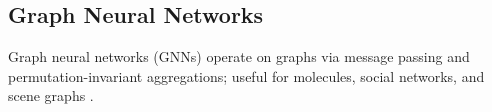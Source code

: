 \subsection{Graph Neural Networks}

Graph neural networks (GNNs) operate on graphs via message passing and permutation-invariant aggregations; useful for molecules, social networks, and scene graphs \textcite{Prince2023}.


